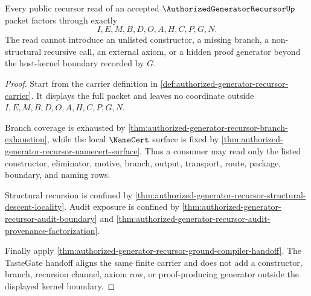 \begin{theorem}
\label{thm:authorized-generator-recursor-kernel-boundary-exhaustion}
Every public recursor read of an accepted $\AuthorizedGeneratorRecursorUp$ packet factors through exactly
$$
I,E,M,B,D,O,A,H,C,P,G,N.
$$
The read cannot introduce an unlisted constructor, a missing branch, a non-structural recursive call, an external axiom, or a hidden proof generator beyond the host-kernel boundary recorded by $G$.
\end{theorem}
\begin{proof}
Start from the carrier definition in \autoref{def:authorized-generator-recursor-carrier}. It displays the full packet and leaves no coordinate outside $I,E,M,B,D,O,A,H,C,P,G,N$.

Branch coverage is exhausted by \autoref{thm:authorized-generator-recursor-branch-exhaustion}, while the local $\NameCert$ surface is fixed by \autoref{thm:authorized-generator-recursor-namecert-surface}. Thus a consumer may read only the listed constructor, eliminator, motive, branch, output, transport, route, package, boundary, and naming rows.

Structural recursion is confined by \autoref{thm:authorized-generator-recursor-structural-descent-locality}. Audit exposure is confined by \autoref{thm:authorized-generator-recursor-audit-boundary} and \autoref{thm:authorized-generator-recursor-audit-provenance-factorization}.

Finally apply \autoref{thm:authorized-generator-recursor-ground-compiler-handoff}. The TasteGate handoff aligns the same finite carrier and does not add a constructor, branch, recursion channel, axiom row, or proof-producing generator outside the displayed kernel boundary.
\end{proof}


